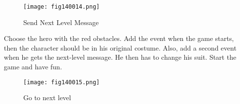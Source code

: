\begin{figure}[H]
   \centering
   \texttt{[image: fig140014.png]}
   \caption{Send Next Level Message}
\label{fig140014}
\end{figure}

Choose the hero with the red obstacles. Add the event when the game starts, then the character should be in his original costume. Also, add a second event when he gets the next-level message. He then has to change his suit. Start the game and have fun.

\begin{figure}[H]
   \centering
   \texttt{[image: fig140015.png]}
   \caption{Go to next level}
\label{fig140015}
\end{figure}
